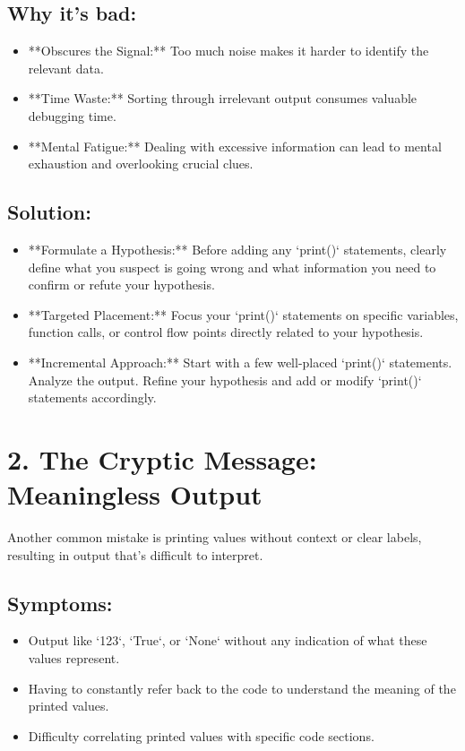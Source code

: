 \documentclass{article}
\begin{document}
\subsection*{Why it's bad:}

\begin{itemize}
    \item **Obscures the Signal:** Too much noise makes it harder to identify the relevant data.
    \item **Time Waste:**  Sorting through irrelevant output consumes valuable debugging time.
    \item **Mental Fatigue:**  Dealing with excessive information can lead to mental exhaustion and overlooking crucial clues.
\end{itemize}

\subsection*{Solution:}

\begin{itemize}
    \item **Formulate a Hypothesis:** Before adding any `print()` statements, clearly define what you suspect is going wrong and what information you need to confirm or refute your hypothesis.
    \item **Targeted Placement:** Focus your `print()` statements on specific variables, function calls, or control flow points directly related to your hypothesis.
    \item **Incremental Approach:**  Start with a few well-placed `print()` statements. Analyze the output. Refine your hypothesis and add or modify `print()` statements accordingly.
\end{itemize}

\section*{2. The Cryptic Message: Meaningless Output}

Another common mistake is printing values without context or clear labels, resulting in output that's difficult to interpret.

\subsection*{Symptoms:}

\begin{itemize}
    \item Output like `123`, `True`, or `None` without any indication of what these values represent.
    \item Having to constantly refer back to the code to understand the meaning of the printed values.
    \item Difficulty correlating printed values with specific code sections.
\end{itemize}
\end{document}
